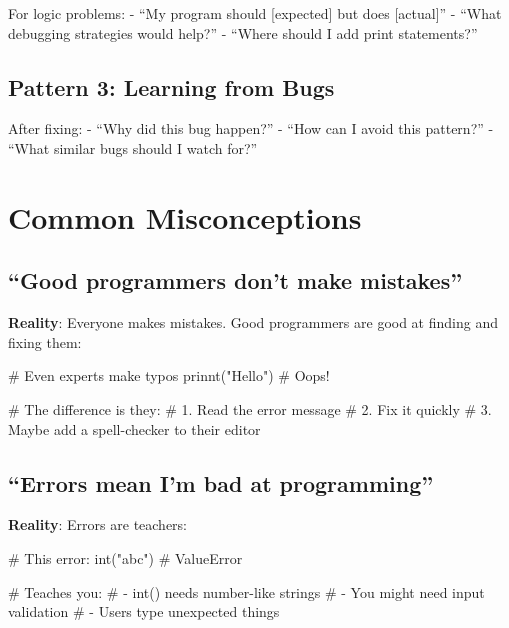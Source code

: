\documentclass[
  letterpaper,
  DIV=11,
  numbers=noendperiod,
  oneside]{scrreprt}
\newenvironment{Shaded}{}{}
\newcommand{\BuiltInTok}[1]{\textcolor[rgb]{0.84,0.23,0.29}{#1}}
\newcommand{\CommentTok}[1]{\textcolor[rgb]{0.42,0.45,0.49}{#1}}
\newcommand{\NormalTok}[1]{\textcolor[rgb]{0.14,0.16,0.18}{#1}}
\newcommand{\StringTok}[1]{\textcolor[rgb]{0.01,0.18,0.38}{#1}}
\begin{document}
For logic problems: - ``My program should {[}expected{]} but does
{[}actual{]}'' - ``What debugging strategies would help?'' - ``Where
should I add print statements?''

\subsection{Pattern 3: Learning from
Bugs}\label{pattern-3-learning-from-bugs}

After fixing: - ``Why did this bug happen?'' - ``How can I avoid this
pattern?'' - ``What similar bugs should I watch for?''

\section{Common Misconceptions}\label{common-misconceptions-8}

\subsection{``Good programmers don't make
mistakes''}\label{good-programmers-dont-make-mistakes}

\textbf{Reality}: Everyone makes mistakes. Good programmers are good at
finding and fixing them:

\begin{Shaded}
\begin{Highlighting}[]
\CommentTok{\# Even experts make typos}
\NormalTok{prinnt(}\StringTok{"Hello"}\NormalTok{)  }\CommentTok{\# Oops!}

\CommentTok{\# The difference is they:}
\CommentTok{\# 1. Read the error message}
\CommentTok{\# 2. Fix it quickly}
\CommentTok{\# 3. Maybe add a spell{-}checker to their editor}
\end{Highlighting}
\end{Shaded}

\subsection{``Errors mean I'm bad at
programming''}\label{errors-mean-im-bad-at-programming}

\textbf{Reality}: Errors are teachers:

\begin{Shaded}
\begin{Highlighting}[]
\CommentTok{\# This error:}
\BuiltInTok{int}\NormalTok{(}\StringTok{"abc"}\NormalTok{)  }\CommentTok{\# ValueError}

\CommentTok{\# Teaches you:}
\CommentTok{\# {-} int() needs number{-}like strings}
\CommentTok{\# {-} You might need input validation}
\CommentTok{\# {-} Users type unexpected things}
\end{Highlighting}
\end{Shaded}
\end{document}

